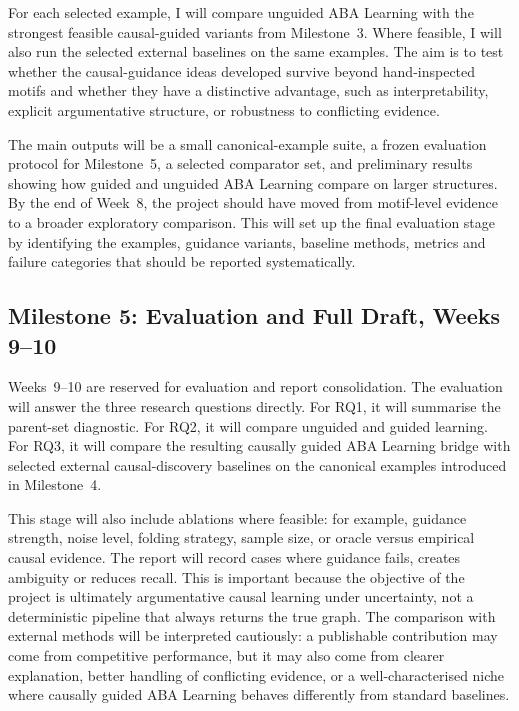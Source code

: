 For each selected example, I will compare unguided ABA Learning with the strongest feasible causal-guided variants from Milestone~3. Where feasible, I will also run the selected external baselines on the same examples. The aim is to test whether the causal-guidance ideas developed survive beyond hand-inspected motifs and whether they have a distinctive advantage, such as interpretability, explicit argumentative structure, or robustness to conflicting evidence.

The main outputs will be a small canonical-example suite, a frozen evaluation protocol for Milestone~5, a selected comparator set, and preliminary results showing how guided and unguided ABA Learning compare on larger structures. By the end of Week~8, the project should have moved from motif-level evidence to a broader exploratory comparison. This will set up the final evaluation stage by identifying the examples, guidance variants, baseline methods, metrics and failure categories that should be reported systematically.

\subsection{Milestone 5: Evaluation and Full Draft, Weeks 9--10}
\label{subsec:milestone-evaluation}

Weeks~9--10 are reserved for evaluation and report consolidation. The evaluation will answer the three research questions directly. For RQ1, it will summarise the parent-set diagnostic. For RQ2, it will compare unguided and guided learning. For RQ3, it will compare the resulting causally guided ABA Learning bridge with selected external causal-discovery baselines on the canonical examples introduced in Milestone~4.

This stage will also include ablations where feasible: for example, guidance strength, noise level, folding strategy, sample size, or oracle versus empirical causal evidence. The report will record cases where guidance fails, creates ambiguity or reduces recall. This is important because the objective of the project is ultimately argumentative causal learning under uncertainty, not a deterministic pipeline that always returns the true graph. The comparison with external methods will be interpreted cautiously: a publishable contribution may come from competitive performance, but it may also come from clearer explanation, better handling of conflicting evidence, or a well-characterised niche where causally guided ABA Learning behaves differently from standard baselines.

